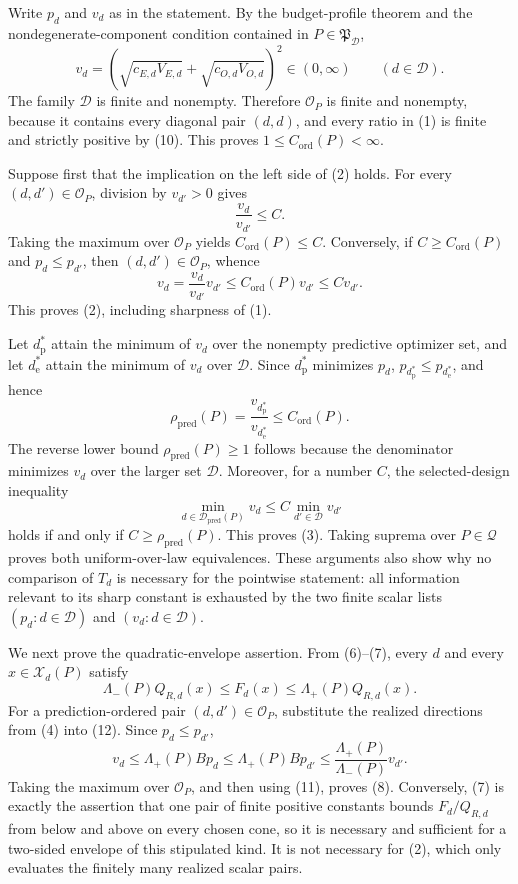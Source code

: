 Write \(p_d\) and \(v_d\) as in the statement.  By the budget-profile theorem and the nondegenerate-component condition contained in \(P\in\mathfrak P_{\mathcal D}\),
\[
 v_d
 =\left(\sqrt{c_{E,d}V_{E,d}}+\sqrt{c_{O,d}V_{O,d}}\right)^2
 \in(0,\infty)
 \qquad(d\in\mathcal D).
 \tag{10}
\]
The family \(\mathcal D\) is finite and nonempty.  Therefore \(\mathcal O_P\) is finite and nonempty, because it contains every diagonal pair \((d,d)\), and every ratio in (1) is finite and strictly positive by (10).  This proves
\(1\le C_{\mathrm{ord}}(P)<\infty\).

Suppose first that the implication on the left side of (2) holds.  For every \((d,d')\in\mathcal O_P\), division by \(v_{d'}>0\) gives
\[
 \frac{v_d}{v_{d'}}\le C.
\]
Taking the maximum over \(\mathcal O_P\) yields \(C_{\mathrm{ord}}(P)\le C\).  Conversely, if \(C\ge C_{\mathrm{ord}}(P)\) and \(p_d\le p_{d'}\), then \((d,d')\in\mathcal O_P\), whence
\[
 v_d
 =\frac{v_d}{v_{d'}}v_{d'}
 \le C_{\mathrm{ord}}(P)v_{d'}
 \le Cv_{d'}.
\]
This proves (2), including sharpness of (1).

Let \(d_{\mathrm p}^*\) attain the minimum of \(v_d\) over the nonempty predictive optimizer set, and let \(d_{\mathrm e}^*\) attain the minimum of \(v_d\) over \(\mathcal D\).  Since \(d_{\mathrm p}^*\) minimizes \(p_d\),
\(p_{d_{\mathrm p}^*}\le p_{d_{\mathrm e}^*}\), and hence
\[
 \rho_{\mathrm{pred}}(P)
 =\frac{v_{d_{\mathrm p}^*}}{v_{d_{\mathrm e}^*}}
 \le C_{\mathrm{ord}}(P).
 \tag{11}
\]
The reverse lower bound \(\rho_{\mathrm{pred}}(P)\ge1\) follows because the denominator minimizes \(v_d\) over the larger set \(\mathcal D\).  Moreover, for a number \(C\), the selected-design inequality
\[
 \min_{d\in\mathcal D_{\mathrm{pred}}(P)}v_d
 \le C\min_{d'\in\mathcal D}v_{d'}
\]
holds if and only if \(C\ge\rho_{\mathrm{pred}}(P)\).  This proves (3).  Taking suprema over \(P\in\mathcal Q\) proves both uniform-over-law equivalences.  These arguments also show why no comparison of \(T_d\) is necessary for the pointwise statement: all information relevant to its sharp constant is exhausted by the two finite scalar lists \((p_d:d\in\mathcal D)\) and \((v_d:d\in\mathcal D)\).

We next prove the quadratic-envelope assertion.  From (6)--(7), every \(d\) and every \(x\in\mathcal X_d(P)\) satisfy
\[
 \Lambda_-(P)Q_{R,d}(x)
 \le F_d(x)
 \le\Lambda_+(P)Q_{R,d}(x).
 \tag{12}
\]
For a prediction-ordered pair \((d,d')\in\mathcal O_P\), substitute the realized directions from (4) into (12).  Since \(p_d\le p_{d'}\),
\[
 v_d
 \le\Lambda_+(P)Bp_d
 \le\Lambda_+(P)Bp_{d'}
 \le\frac{\Lambda_+(P)}{\Lambda_-(P)}v_{d'}.
 \tag{13}
\]
Taking the maximum over \(\mathcal O_P\), and then using (11), proves (8).  Conversely, (7) is exactly the assertion that one pair of finite positive constants bounds \(F_d/Q_{R,d}\) from below and above on every chosen cone, so it is necessary and sufficient for a two-sided envelope of this stipulated kind.  It is not necessary for (2), which only evaluates the finitely many realized scalar pairs.

